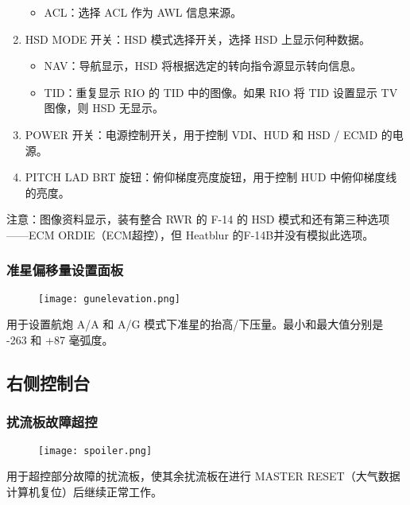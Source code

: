 \begin{enumerate}
\begin{itemize}
    \item ACL：选择 ACL 作为 AWL 信息来源。
  \end{itemize}
  \item HSD MODE 开关：HSD 模式选择开关，选择 HSD 上显示何种数据。
  \begin{itemize}
    \item NAV：导航显示，HSD 将根据选定的转向指令源显示转向信息。
    \item TID：重复显示 RIO 的 TID 中的图像。如果 RIO 将 TID 设置显示 TV 图像，则 HSD 无显示。
  \end{itemize}
  \item POWER 开关：电源控制开关，用于控制 VDI、HUD 和 HSD / ECMD 的电源。
  \item PITCH LAD BRT 旋钮：俯仰梯度亮度旋钮，用于控制 HUD 中俯仰梯度线的亮度。
\end{enumerate}
注意：图像资料显示，装有整合 RWR 的 F-14 的 HSD 模式和还有第三种选项——ECM ORDIE（ECM超控），但 Heatblur 的F-14B并没有模拟此选项。

\subsubsection{准星偏移量设置面板}

\begin{figure}[htb]
  \center
  \texttt{[image: gunelevation.png]}
\end{figure}
用于设置航炮 A/A 和 A/G 模式下准星的抬高/下压量。最小和最大值分别是 -263 和 +87 毫弧度。

\subsection{右侧控制台}

\subsubsection{扰流板故障超控}

\begin{figure}[htb]
  \center
  \texttt{[image: spoiler.png]}
\end{figure}
用于超控部分故障的扰流板，使其余扰流板在进行 MASTER RESET（大气数据计算机复位）后继续正常工作。

